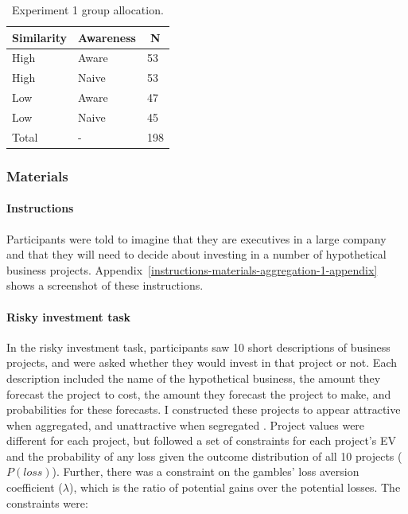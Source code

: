 \documentclass[a4paper, nobind, dvipsnames]{templates/ociamthesis}
\theoremstyle{definition}
\theoremstyle{definition}
\theoremstyle{definition}
\theoremstyle{definition}
\theoremstyle{remark}
\begin{document}
\begin{table}[tbp]

\begin{center}
\begin{threeparttable}

\caption{\label{tab:condition-allocation-aggregation-1}Experiment 1 group allocation.}

\begin{tabular}{lll}
\toprule
Similarity & \multicolumn{1}{c}{Awareness} & \multicolumn{1}{c}{N}\\
\midrule
High & Aware & 53\\
High & Naive & 53\\
Low & Aware & 47\\
Low & Naive & 45\\
Total & - & 198\\
\bottomrule
\end{tabular}

\end{threeparttable}
\end{center}

\end{table}

\subsubsection{Materials}

\hypertarget{instructions-materials-aggregation-1}{%
\paragraph{Instructions}\label{instructions-materials-aggregation-1}}

Participants were told to imagine that they are executives in a large company
and that they will need to decide about investing in a number of hypothetical
business projects. Appendix~\ref{instructions-materials-aggregation-1-appendix}
shows a screenshot of these instructions.

\hypertarget{task-aggregation-1}{%
\paragraph{Risky investment task}\label{task-aggregation-1}}

In the risky investment task, participants saw 10 short descriptions of business
projects, and were asked whether they would invest in that project or not. Each
description included the name of the hypothetical business, the amount they
forecast the project to cost, the amount they forecast the project to make, and
probabilities for these forecasts. I constructed these projects to appear
attractive when aggregated, and unattractive when segregated \autocite[see][]{langer2001}.
Project values were different for each project, but followed a set of
constraints for each project's EV and the probability of any loss given the
outcome distribution of all 10 projects (\(P(loss)\)). Further, there was a
constraint on the gambles' loss aversion coefficient (\(\lambda\)), which is the
ratio of potential gains over the potential losses. The constraints were:
\end{document}
